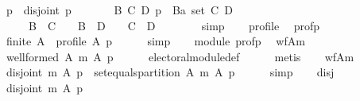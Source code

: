 \begin{isabellebody}
\ \ \ \ {\isachardoublequoteopen}{\isasymforall}p{\isachardot}{\kern0pt}\ {\isasymnot}\ disjoint{}\ p\ {\isasymor}\isanewline
\ \ \ \ \ \ {\isacharparenleft}{\kern0pt}{\isasymexists}B\ C\ D{\isachardot}{\kern0pt}\ p\ {\isacharequal}{\kern0pt}\ {\isacharparenleft}{\kern0pt}B{\isacharcolon}{\kern0pt}{\isacharcolon}{\kern0pt}{\isacharprime}{\kern0pt}a\ set{\isacharcomma}{\kern0pt}\ C{\isacharcomma}{\kern0pt}\ D{\isacharparenright}{\kern0pt}\ {\isasymand}\isanewline
\ \ \ \ \ \ \ \ B\ {\isasyminter}\ C\ {\isacharequal}{\kern0pt}\ {\isacharbraceleft}{\kern0pt}{\isacharbraceright}{\kern0pt}\ {\isasymand}\ B\ {\isasyminter}\ D\ {\isacharequal}{\kern0pt}\ {\isacharbraceleft}{\kern0pt}{\isacharbraceright}{\kern0pt}\ {\isasymand}\ C\ {\isasyminter}\ D\ {\isacharequal}{\kern0pt}\ {\isacharbraceleft}{\kern0pt}{\isacharbraceright}{\kern0pt}{\isacharparenright}{\kern0pt}{\isachardoublequoteclose}\isanewline
\ \ \ \ \isamarkupfalse%
\ simp\isanewline
\ \ \isamarkupfalse%
\ profile\ \isamarkupfalse%
\ prof{\isacharunderscore}{\kern0pt}p{\isacharcolon}{\kern0pt}\isanewline
\ \ \ \ {\isachardoublequoteopen}finite\ A\ {\isasymand}\ profile\ A\ p{\isachardoublequoteclose}\isanewline
\ \ \ \ \isamarkupfalse%
\ simp\isanewline
\ \ \isamarkupfalse%
\ module\ prof{\isacharunderscore}{\kern0pt}p\ \isamarkupfalse%
\ wf{\isacharunderscore}{\kern0pt}A{\isacharunderscore}{\kern0pt}m{\isacharcolon}{\kern0pt}\isanewline
\ \ \ \ {\isachardoublequoteopen}well{\isacharunderscore}{\kern0pt}formed\ A\ {\isacharparenleft}{\kern0pt}m\ A\ p{\isacharparenright}{\kern0pt}{\isachardoublequoteclose}\isanewline
\ \ \ \ \isamarkupfalse%
\ electoral{\isacharunderscore}{\kern0pt}module{\isacharunderscore}{\kern0pt}def\isanewline
\ \ \ \ \isamarkupfalse%
\ metis\isanewline
\ \ \isamarkupfalse%
\ wf{\isacharunderscore}{\kern0pt}A{\isacharunderscore}{\kern0pt}m{\isacharunderscore}{\kern0pt}{}{\isacharcolon}{\kern0pt}\isanewline
\ \ \ \ {\isachardoublequoteopen}disjoint{}\ {\isacharparenleft}{\kern0pt}m\ A\ p{\isacharparenright}{\kern0pt}\ {\isasymand}\ set{\isacharunderscore}{\kern0pt}equals{\isacharunderscore}{\kern0pt}partition\ A\ {\isacharparenleft}{\kern0pt}m\ A\ p{\isacharparenright}{\kern0pt}{\isachardoublequoteclose}\isanewline
\ \ \ \ \isamarkupfalse%
\ simp\isanewline
\ \ \isamarkupfalse%
\ disj{}{\isacharcolon}{\kern0pt}\isanewline
\ \ \ \ {\isachardoublequoteopen}disjoint{}\ {\isacharparenleft}{\kern0pt}m\ A\ p{\isacharparenright}{\kern0pt}{\isachardoublequoteclose}\isanewline

\end{isabellebody}
